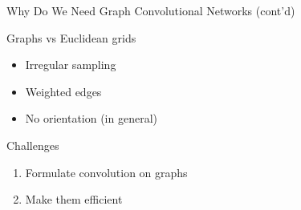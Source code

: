 \documentclass{beamer}
\begin{document}
\begin{frame}{Why Do We Need Graph Convolutional Networks (cont'd)}
  \begin{minipage}[t]{.5\textwidth}
    Graphs vs Euclidean grids
    \begin{itemize}
    \item Irregular sampling
    \item Weighted edges
    \item No orientation (in general)
    \end{itemize}
    \vspace{1cm}
    Challenges
    \begin{enumerate}
    \item Formulate convolution on graphs
    \item Make them efficient
    \end{enumerate}
  \end{minipage}
  \begin{minipage}[t]{.4\textwidth}
    \begin{figure}[ht]
      \centering

\end{figure}
\end{minipage}
\end{frame}
\end{document}
